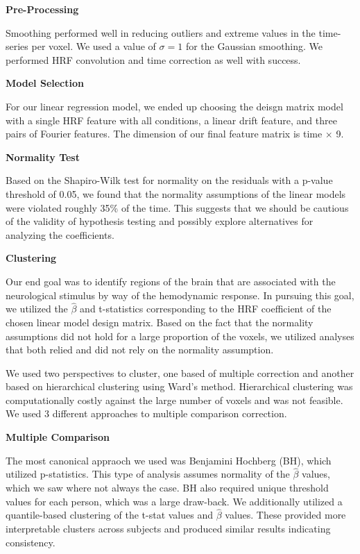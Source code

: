 
\noindent \textbf{Pre-Processing}

Smoothing performed well in reducing outliers and extreme values in the 
time-series per voxel. We used a value of $\sigma=1$ for the Gaussian 
smoothing. We performed HRF convolution and time correction as well with 
success.
\vspace{5mm}

\noindent \textbf{Model Selection}

For our linear regression model, we ended up choosing the deisgn matrix model 
with a single HRF feature with all conditions, a linear drift feature, and 
three pairs of Fourier features. The dimension of our final feature matrix is 
time $\times$ 9. 
\vspace{5mm}

\noindent \textbf{Normality Test}

Based on the Shapiro-Wilk test for normality on the residuals with a p-value 
threshold of 0.05, we found that the normality assumptions of the linear 
models were violated roughly 35\% of the time. This suggests that we should be 
cautious of the validity of hypothesis testing and possibly explore 
alternatives for analyzing the coefficients.
\vspace{5mm}

\noindent \textbf{Clustering}

Our end goal was to identify regions of the brain that are associated with the 
neurological stimulus by way of the hemodynamic response. In pursuing this 
goal, we utilized the $\hat{\beta}$ and t-statistics corresponding to the HRF 
coefficient of the chosen linear model design matrix. Based on the fact that 
the normality assumptions did not hold for a large proportion of the voxels, 
we utilized analyses that both relied and did not rely on the normality 
assumption.

We used two perspectives to cluster, one based of multiple correction and 
another based on hierarchical clustering using Ward's method. Hierarchical 
clustering was computationally costly against the large number of voxels and 
was not feasible. We used 3 different approaches to multiple comparison 
correction. 
\vspace{5mm}

\noindent \textbf{Multiple Comparison}

The most canonical appraoch we used was Benjamini Hochberg (BH), which 
utilized p-statistics. This type of analysis assumes normality of the 
$\hat{\beta}$ values, which we saw where not always the case. BH also 
required unique threshold values for each person, which was a large draw-back. 
We additionally utilized a quantile-based clustering of the t-stat values and 
$\hat{\beta}$ values. These provided more interpretable clusters across 
subjects and produced similar results indicating consistency.
\vspace{5mm}

